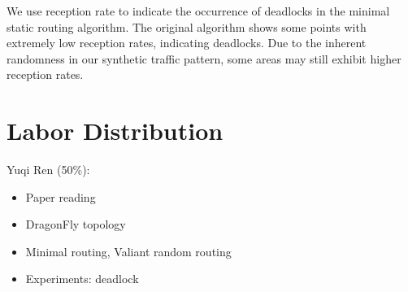 \documentclass[utf8]{article}
\begin{document}
We use reception rate to indicate the occurrence of deadlocks in the minimal static routing algorithm. The original algorithm shows some points with extremely low reception rates, indicating deadlocks. Due to the inherent randomness in our synthetic traffic pattern, some areas may still exhibit higher reception rates.

\section{Labor Distribution}
Yuqi Ren (50\%):
\begin{itemize}
    \item Paper reading
    \item DragonFly topology
    \item Minimal routing, Valiant random routing
    \item Experiments: deadlock
\end{itemize}
\end{document}
